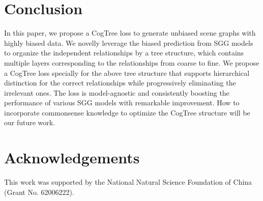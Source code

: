 \documentclass{article}
\begin{document}
\section{Conclusion}
In this paper, we propose a CogTree loss to generate  unbiased scene graphs with highly biased data. We novelly leverage the biased prediction from SGG models to organize the independent relationships by a tree structure, which contains multiple layers corresponding to the relationships from coarse to fine. We propose a CogTree loss specially for the above tree structure that supports hierarchical distinction for the correct relationships while progressively eliminating the irrelevant ones. The loss is model-agnostic and consistently boosting the performance of various SGG models with remarkable improvement. How to incorporate commonsense knowledge to optimize the CogTree structure will be our future work.

\section*{Acknowledgements}
This  work  was  supported  by  the  National  Natural  Science  Foundation  of China (Grant No. 62006222).



\end{document}
